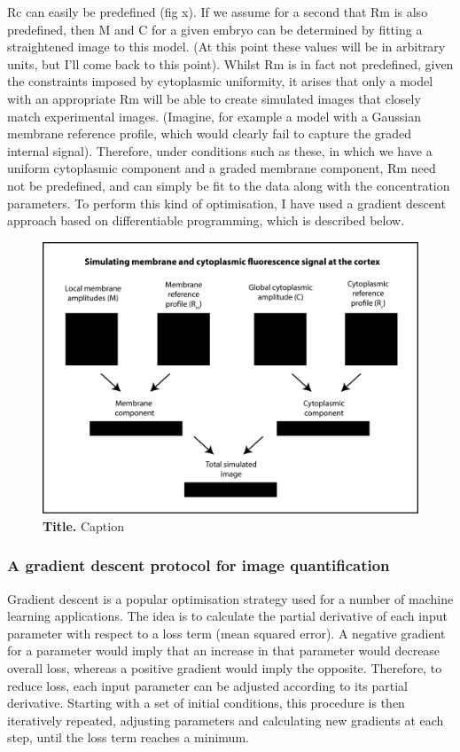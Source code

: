 \documentclass[12pt]{"article"}
\newcommand{\mycaption}[2]{\caption[#1]{\textbf{#1.} #2}}
\begin{document}
Rc can easily be predefined (fig x). If we assume for a second that Rm is also predefined, then M and C for a given embryo can be determined by fitting a straightened image to this model. (At this point these values will be in arbitrary units, but I’ll come back to this point). Whilst Rm is in fact not predefined, given the constraints imposed by cytoplasmic uniformity, it arises that only a model with an appropriate Rm will be able to create simulated images that closely match experimental images. (Imagine, for example a model with a Gaussian membrane reference profile, which would clearly fail to capture the graded internal signal). Therefore, under conditions such as these, in which we have a uniform cytoplasmic component and a graded membrane component, Rm need not be predefined, and can simply be fit to the data along with the concentration parameters. To perform this kind of optimisation, I have used a gradient descent approach based on differentiable programming, which is described below.\\

\begin{figure}[!h]
\includegraphics[scale=1.1]{memquant_model_schematic}
\setlength{\abovecaptionskip}{20pt}
\centering
\mycaption{Title}{Caption}
\end{figure}

\subsubsection{A gradient descent protocol for image quantification}

Gradient descent is a popular optimisation strategy used for a number of machine learning applications. The idea is to calculate the partial derivative of each input parameter with respect to a loss term (mean squared error). A negative gradient for a parameter would imply that an increase in that parameter would decrease overall loss, whereas a positive gradient would imply the opposite. Therefore, to reduce loss, each input parameter can be adjusted according to its partial derivative. Starting with a set of initial conditions, this procedure is then iteratively repeated, adjusting parameters and calculating new gradients at each step, until the loss term reaches a minimum. \\
\end{document}
